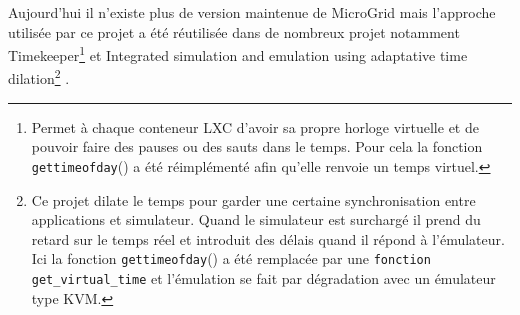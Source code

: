 Aujourd'hui il n'existe plus de version maintenue de MicroGrid mais l'approche utilisée par ce projet a été réutilisée dans de nombreux projet notamment Timekeeper\footnote{Permet à chaque conteneur LXC d'avoir sa propre horloge virtuelle et de pouvoir faire des pauses ou des sauts dans le temps. Pour cela la fonction \texttt{gettimeofday}() a été réimplémenté afin qu'elle renvoie un temps virtuel.} \citep{MICROGRID_lamps2014timekeeper} et Integrated simulation and emulation using adaptative time dilation\footnote{Ce projet  dilate le temps pour garder une certaine synchronisation entre applications et simulateur. Quand le simulateur est surchargé il prend du retard sur le temps réel et introduit des délais quand il répond à l'émulateur. Ici la fonction \texttt{gettimeofday}() a été remplacée par une \texttt{fonction get\_virtual\_time} et l'émulation se fait par dégradation avec un émulateur type KVM.} \citep{MICROGRID_lee2014integrated}.
